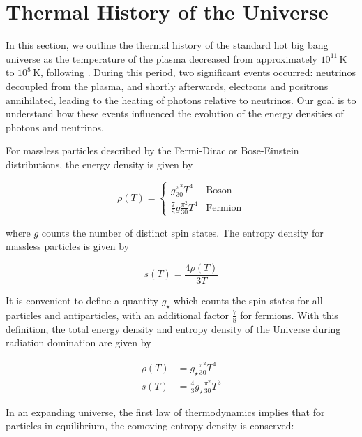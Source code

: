 \section{Thermal History of the Universe} \label{thermal history}

In this section, we outline the thermal history of the standard hot big bang universe as the temperature of the plasma decreased from approximately $10^{11} \, \text{K}$ to $10^{8} \, \text{K}$, following \cite{Weinberg:2008zzc}. During this period, two significant events occurred: neutrinos decoupled from the plasma, and shortly afterwards, electrons and positrons annihilated, leading to the heating of photons relative to neutrinos. Our goal is to understand how these events influenced the evolution of the energy densities of photons and neutrinos.

For massless particles described by the Fermi-Dirac or Bose-Einstein distributions, the energy density is given by

\begin{equation}
    \rho(T)= 
    \begin{cases}
        g \frac{\pi^{2}}{30} T^{4} & \text{Boson} \\
        \frac{7}{8} g \frac{\pi^{2}}{30} T^{4} & \text{Fermion}
    \end{cases}\label{1.50}
\end{equation}

where $g$ counts the number of distinct spin states. The entropy density for massless particles is given by

\begin{equation}
    s(T)=\frac{4 \rho(T)}{3 T}\label{1.51}
\end{equation}

It is convenient to define a quantity $g_{\star}$ which counts the spin states for all particles and antiparticles, with an additional factor $\frac{7}{8}$ for fermions. With this definition, the total energy density and entropy density of the Universe during radiation domination are given by

\begin{align}
    \rho(T) & = g_{\star} \frac{\pi^{2}}{30} T^{4} \\
    s(T) & = \frac{4}{3} g_{\star} \frac{\pi^{2}}{30} T^{3} \label{1.52}
\end{align}

In an expanding universe, the first law of thermodynamics implies that for particles in equilibrium, the comoving entropy density is conserved:


